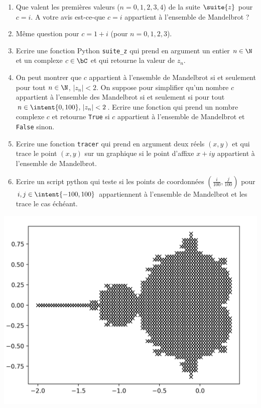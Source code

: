 \begin{exercice}
\begin{enumerate}
\item Que valent les premières valeurs ($n=0,1,2,3,4$) de la suite $\suite{z}$ pour $c=i$.  A votre avis est-ce-que $c=i$ appartient à l'ensemble de Mandelbrot ? 
\item Même question pour $c=1+i$ (pour $n=0,1,2,3$).
\item Ecrire une fonction Python \texttt{suite\_z} qui prend en argument un entier $n\in \N$ et un complexe $c\in \bC$ et qui retourne la valeur de $z_n$.
\item On peut montrer que $c$ appartient à l'ensemble de Mandelbrot si et seulement pour tout $n\in \N$,  $|z_n|<2$.
On suppose pour simplifier qu'un nombre $c$ appartient à l'ensemble des Mandelbrot si et seulement si  pour tout $n\in \intent{0,100},   \, |z_n|<2$.
Ecrire une fonction  qui prend un nombre complexe $c$ et retourne \texttt{True} si $c$ appartient à l'ensemble de Mandelbrot et \texttt{False} sinon. 
\item Ecrire une fonction \texttt{tracer} qui prend en argument deux réels $(x,y)$ et qui trace le point $(x,y)$ sur un graphique si le point d'affixe $x+iy$ appartient à l'ensemble de Mandelbrot. 
\item Ecrire un script python qui teste  si les points de coordonnées $\left( \frac{i}{100}, \frac{j}{100}\right)$ pour $i, j\in \intent{-100,100}$ appartiennent à l'ensemble de Mandelbrot et les trace le cas échéant. 
\end{enumerate}
\begin{center}
\includegraphics[scale=0.4]{mandelbrot.png}
\end{center}

\end{exercice}


